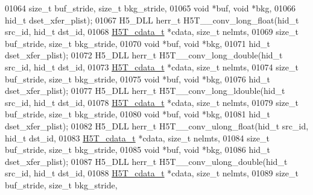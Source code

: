 \begin{DoxyCode}
01064                      \textcolor{keywordtype}{size\_t} buf\_stride, \textcolor{keywordtype}{size\_t} bkg\_stride,
01065                                      \textcolor{keywordtype}{void} *buf, \textcolor{keywordtype}{void} *bkg,
01066                                      hid\_t dset\_xfer\_plist);
01067 H5\_DLL herr\_t H5T\_\_conv\_long\_float(hid\_t src\_id, hid\_t dst\_id,
01068                      \hyperlink{struct_h5_t__cdata__t}{H5T\_cdata\_t} *cdata, \textcolor{keywordtype}{size\_t} nelmts,
01069                      \textcolor{keywordtype}{size\_t} buf\_stride, \textcolor{keywordtype}{size\_t} bkg\_stride,
01070                                      \textcolor{keywordtype}{void} *buf, \textcolor{keywordtype}{void} *bkg,
01071                                      hid\_t dset\_xfer\_plist);
01072 H5\_DLL herr\_t H5T\_\_conv\_long\_double(hid\_t src\_id, hid\_t dst\_id,
01073                      \hyperlink{struct_h5_t__cdata__t}{H5T\_cdata\_t} *cdata, \textcolor{keywordtype}{size\_t} nelmts,
01074                      \textcolor{keywordtype}{size\_t} buf\_stride, \textcolor{keywordtype}{size\_t} bkg\_stride,
01075                                      \textcolor{keywordtype}{void} *buf, \textcolor{keywordtype}{void} *bkg,
01076                                      hid\_t dset\_xfer\_plist);
01077 H5\_DLL herr\_t H5T\_\_conv\_long\_ldouble(hid\_t src\_id, hid\_t dst\_id,
01078                      \hyperlink{struct_h5_t__cdata__t}{H5T\_cdata\_t} *cdata, \textcolor{keywordtype}{size\_t} nelmts,
01079                      \textcolor{keywordtype}{size\_t} buf\_stride, \textcolor{keywordtype}{size\_t} bkg\_stride,
01080                                      \textcolor{keywordtype}{void} *buf, \textcolor{keywordtype}{void} *bkg,
01081                                      hid\_t dset\_xfer\_plist);
01082 H5\_DLL herr\_t H5T\_\_conv\_ulong\_float(hid\_t src\_id, hid\_t dst\_id,
01083                      \hyperlink{struct_h5_t__cdata__t}{H5T\_cdata\_t} *cdata, \textcolor{keywordtype}{size\_t} nelmts,
01084                      \textcolor{keywordtype}{size\_t} buf\_stride, \textcolor{keywordtype}{size\_t} bkg\_stride,
01085                                      \textcolor{keywordtype}{void} *buf, \textcolor{keywordtype}{void} *bkg,
01086                                      hid\_t dset\_xfer\_plist);
01087 H5\_DLL herr\_t H5T\_\_conv\_ulong\_double(hid\_t src\_id, hid\_t dst\_id,
01088                      \hyperlink{struct_h5_t__cdata__t}{H5T\_cdata\_t} *cdata, \textcolor{keywordtype}{size\_t} nelmts,
01089                      \textcolor{keywordtype}{size\_t} buf\_stride, \textcolor{keywordtype}{size\_t} bkg\_stride,

\end{DoxyCode}
